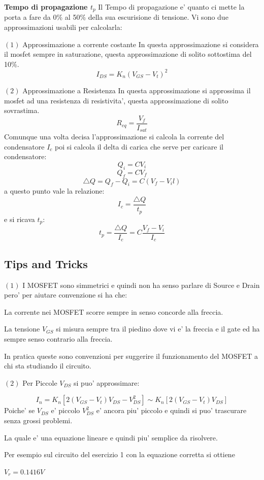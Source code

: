 \documentclass[\main/main.tex]{subfiles}
\begin{document}
\textbf{Tempo di propagazione $t_p$}
Il Tempo di propagazione e' quanto ci mette la porta a fare da 0\% al 50\% della sua escurisione di tensione.
Vi sono due approssimazioni usabili per calcolarla:

$(1)$ Approssimazione a corrente costante
In questa approssimazione si considera il mosfet sempre in saturazione, questa approssimazione di solito sottostima del 10\%.
\[ I_{DS} = K_n \left( V_{GS} - V_t \right)^2\]

$(2)$ Approssimazione a Resistenza
In questa approssimazione si approssima il mosfet ad una resistenza di resistivita', questa approssimazione di solito sovrastima.
\[R_{eq} = \frac{V_f}{I_{sat}} \]
Comunque una volta decisa l'approssimazione si calcola la corrente del condensatore $I_c$ poi si calcola il delta di carica che serve per caricare il condensatore:
\[Q_i = C V_i\]
\[Q_f = C V_f\]
\[\bigtriangleup Q = Q_f - Q_i = C \left( V_f - V_il\right) \]
a questo punto vale la relazione:
\[I_c = \frac{\bigtriangleup Q}{t_p}\]
e si ricava $t_p$:
\[t_p = \frac{\bigtriangleup Q}{I_c} = C \frac{V_f - V_i}{I_c}\]



\subsection{Tips and Tricks}
$(1)$ I MOSFET sono simmetrici e quindi non ha senso parlare di Source e Drain pero' per aiutare convenzione si ha che:

La corrente nei MOSFET scorre sempre in senso concorde alla freccia.

La tensione $V_{GS}$ si misura sempre tra il piedino dove vi e' la freccia e il gate ed ha sempre senso contrario alla freccia.

In pratica queste sono convenzioni per suggerire il funzionamento del MOSFET a chi sta studiando il circuito.

$(2)$ Per Piccole $V_{DS}$ si puo' approssimare:

\[I_n = K_n \left[ 2 \left( V_{GS} -V_t \right)V_{DS} - V_{DS}^2 \right] \sim K_n \left[ 2 \left( V_{GS} -V_t \right)V_{DS} \right]\]
Poiche' se $V_{DS}$ e' piccolo $V_{DS}^2$ e' ancora piu' piccolo e quindi si puo' trascurare senza grossi problemi.

La quale e' una equazione lineare e quindi piu' semplice da risolvere.

Per esempio sul circuito del esercizio 1 con la equazione corretta si ottiene 

$V_r = 0.1416V$
\end{document}
